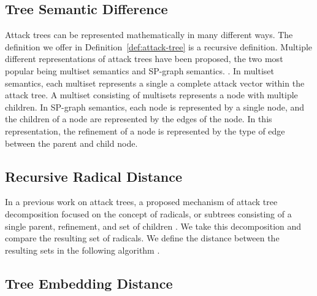 \subsection{Tree Semantic Difference}

Attack trees can be represented mathematically in many different ways. The definition we offer in Definition~\ref{def:attack-tree} is a recursive definition. Multiple different representations of attack trees have been proposed, the two most popular being multiset semantics and SP-graph semantics. . In multiset semantics, each multiset represents a single a complete attack vector within the attack tree. A multiset consisting of multisets represents a node with multiple children. In SP-graph semantics, each node is represented by a single node, and the children of a node are represented by the edges of the node. In this representation, the refinement of a node is represented by the type of edge between the parent and child node. 

\subsection{Recursive Radical Distance}

In a previous work on attack trees, a proposed mechanism of attack tree decomposition focused on the concept of radicals, or subtrees consisting of a single parent, refinement, and set of children . We take this decomposition and compare the resulting set of radicals. We define the distance between the resulting sets in the following algorithm .



\subsection{Tree Embedding Distance}

